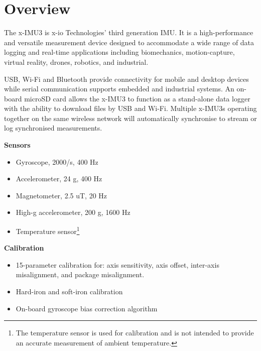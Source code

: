 \section{Overview}

\begin{multicols}{2}

The x-IMU3 is x-io Technologies' third generation \ac{IMU}.  It is a high-performance and versatile measurement device designed to accommodate a wide range of data logging and real-time applications including biomechanics, motion-capture, virtual reality, drones, robotics, and industrial.

\acs{USB}, Wi-Fi and Bluetooth provide connectivity for mobile and desktop devices while serial communication supports embedded and industrial systems.  An on-board \acs{microSD} card allows the x-IMU3 to function as a stand-alone data logger with the ability to download files by USB and Wi-Fi.  Multiple x-IMU3s operating together on the same wireless network will automatically synchronise to stream or log synchronised measurements.

\textbf{Sensors}
\begin{itemize}[nolistsep]
    \item Gyroscope, \textpm{}2000\textdegree{}/s, 400 Hz
    \item Accelerometer, \textpm{}24 g, 400 Hz
    \item Magnetometer, \textpm{}2.5 uT, 20 Hz
    \item High-g accelerometer, \textpm{}200 g, 1600 Hz
    \item Temperature sensor\footnote{The temperature sensor is used for calibration and is not intended to provide an accurate measurement of ambient temperature.}
\end{itemize}

\textbf{Calibration}
\begin{itemize}[nolistsep]
    \item 15-parameter calibration for: axis sensitivity, axis offset, inter-axis misalignment, and package misalignment.
    \item Hard-iron and soft-iron calibration
    \item On-board gyroscope bias correction algorithm
\end{itemize}


\end{multicols}
